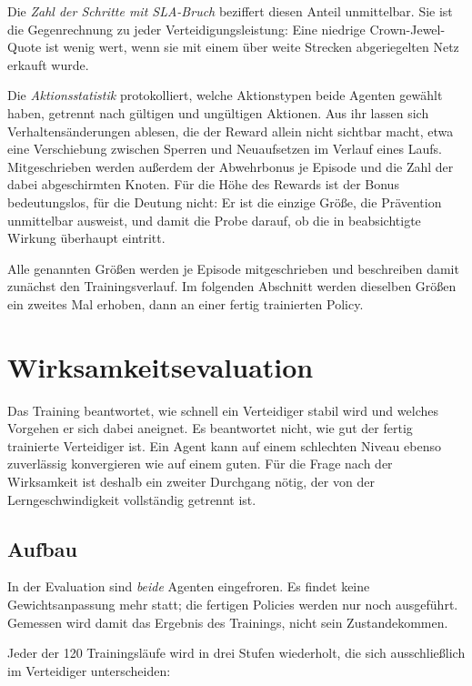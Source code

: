 Die \emph{Zahl der Schritte mit \ac{SLA}-Bruch} beziffert diesen Anteil
unmittelbar. Sie ist die Gegenrechnung zu jeder Verteidigungsleistung: Eine
niedrige Crown-Jewel-Quote ist wenig wert, wenn sie mit einem über weite
Strecken abgeriegelten Netz erkauft wurde.

Die \emph{Aktionsstatistik} protokolliert, welche Aktionstypen beide Agenten
gewählt haben, getrennt nach gültigen und ungültigen Aktionen. Aus ihr lassen
sich Verhaltensänderungen ablesen, die der Reward allein nicht sichtbar macht,
etwa eine Verschiebung zwischen Sperren und Neuaufsetzen im Verlauf eines
Laufs. Mitgeschrieben werden außerdem der Abwehrbonus je Episode und die Zahl
der dabei abgeschirmten Knoten. Für die Höhe des Rewards ist der Bonus
bedeutungslos, für die Deutung nicht: Er ist die einzige Größe, die Prävention
unmittelbar ausweist, und damit die Probe darauf, ob die in
 beabsichtigte Wirkung überhaupt eintritt.

Alle genannten Größen werden je Episode mitgeschrieben und beschreiben damit
zunächst den Trainingsverlauf. Im folgenden Abschnitt werden dieselben Größen
ein zweites Mal erhoben, dann an einer fertig trainierten Policy.

\section{Wirksamkeitsevaluation}
\label{sec:evaluation}

Das Training beantwortet, wie schnell ein Verteidiger stabil wird und welches
Vorgehen er sich dabei aneignet. Es beantwortet nicht, wie gut der fertig
trainierte Verteidiger ist. Ein Agent
kann auf einem schlechten Niveau ebenso zuverlässig konvergieren wie auf einem
guten. Für die Frage nach der Wirksamkeit ist deshalb ein zweiter Durchgang
nötig, der von der Lerngeschwindigkeit vollständig getrennt ist.

\subsection{Aufbau}

In der Evaluation sind \emph{beide} Agenten eingefroren. Es findet keine
Gewichtsanpassung mehr statt; die fertigen Policies werden nur noch
ausgeführt. Gemessen wird damit das Ergebnis des Trainings, nicht sein
Zustandekommen.

Jeder der 120 Trainingsläufe wird in drei Stufen wiederholt, die sich
ausschließlich im Verteidiger unterscheiden:


